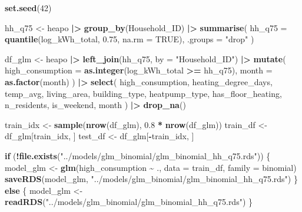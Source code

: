 \documentclass[
]{article}
\newenvironment{Shaded}{\begin{snugshade}}{\end{snugshade}}
\newcommand{\AttributeTok}[1]{\textcolor[rgb]{0.13,0.29,0.53}{#1}}
\newcommand{\ConstantTok}[1]{\textcolor[rgb]{0.56,0.35,0.01}{#1}}
\newcommand{\ControlFlowTok}[1]{\textcolor[rgb]{0.13,0.29,0.53}{\textbf{#1}}}
\newcommand{\DecValTok}[1]{\textcolor[rgb]{0.00,0.00,0.81}{#1}}
\newcommand{\FloatTok}[1]{\textcolor[rgb]{0.00,0.00,0.81}{#1}}
\newcommand{\FunctionTok}[1]{\textcolor[rgb]{0.13,0.29,0.53}{\textbf{#1}}}
\newcommand{\NormalTok}[1]{#1}
\newcommand{\OtherTok}[1]{\textcolor[rgb]{0.56,0.35,0.01}{#1}}
\newcommand{\SpecialCharTok}[1]{\textcolor[rgb]{0.81,0.36,0.00}{\textbf{#1}}}
\newcommand{\StringTok}[1]{\textcolor[rgb]{0.31,0.60,0.02}{#1}}
\begin{document}
\begin{Shaded}
\begin{Highlighting}[]
\FunctionTok{set.seed}\NormalTok{(}\DecValTok{42}\NormalTok{)}

\NormalTok{hh\_q75 }\OtherTok{\textless{}{-}}\NormalTok{ heapo }\SpecialCharTok{|\textgreater{}}
  \FunctionTok{group\_by}\NormalTok{(Household\_ID) }\SpecialCharTok{|\textgreater{}}
  \FunctionTok{summarise}\NormalTok{(}
    \AttributeTok{hh\_q75 =} \FunctionTok{quantile}\NormalTok{(log\_kWh\_total, }\FloatTok{0.75}\NormalTok{, }\AttributeTok{na.rm =} \ConstantTok{TRUE}\NormalTok{),}
    \AttributeTok{.groups =} \StringTok{"drop"}
\NormalTok{  )}

\NormalTok{df\_glm }\OtherTok{\textless{}{-}}\NormalTok{ heapo }\SpecialCharTok{|\textgreater{}}
  \FunctionTok{left\_join}\NormalTok{(hh\_q75, }\AttributeTok{by =} \StringTok{"Household\_ID"}\NormalTok{) }\SpecialCharTok{|\textgreater{}}
  \FunctionTok{mutate}\NormalTok{(}
    \AttributeTok{high\_consumption =} \FunctionTok{as.integer}\NormalTok{(log\_kWh\_total }\SpecialCharTok{\textgreater{}=}\NormalTok{ hh\_q75),}
    \AttributeTok{month =} \FunctionTok{as.factor}\NormalTok{(month)}
\NormalTok{  ) }\SpecialCharTok{|\textgreater{}}
  \FunctionTok{select}\NormalTok{(}
\NormalTok{    high\_consumption,}
\NormalTok{    heating\_degree\_days,}
\NormalTok{    temp\_avg,}
\NormalTok{    living\_area,}
\NormalTok{    building\_type,}
\NormalTok{    heatpump\_type,}
\NormalTok{    has\_floor\_heating,}
\NormalTok{    n\_residents,}
\NormalTok{    is\_weekend,}
\NormalTok{    month}
\NormalTok{  ) }\SpecialCharTok{|\textgreater{}}
  \FunctionTok{drop\_na}\NormalTok{()}

\NormalTok{train\_idx }\OtherTok{\textless{}{-}} \FunctionTok{sample}\NormalTok{(}\FunctionTok{nrow}\NormalTok{(df\_glm), }\FloatTok{0.8} \SpecialCharTok{*} \FunctionTok{nrow}\NormalTok{(df\_glm))}
\NormalTok{train\_df }\OtherTok{\textless{}{-}}\NormalTok{ df\_glm[train\_idx, ]}
\NormalTok{test\_df }\OtherTok{\textless{}{-}}\NormalTok{ df\_glm[}\SpecialCharTok{{-}}\NormalTok{train\_idx, ]}
\end{Highlighting}
\end{Shaded}

\begin{Shaded}
\begin{Highlighting}[]
\ControlFlowTok{if}\NormalTok{ (}\SpecialCharTok{!}\FunctionTok{file.exists}\NormalTok{(}\StringTok{"../models/glm\_binomial/glm\_binomial\_hh\_q75.rds"}\NormalTok{)) \{}
\NormalTok{  model\_glm }\OtherTok{\textless{}{-}} \FunctionTok{glm}\NormalTok{(high\_consumption }\SpecialCharTok{\textasciitilde{}}\NormalTok{ ., }\AttributeTok{data =}\NormalTok{ train\_df, }\AttributeTok{family =}\NormalTok{ binomial)}
  \FunctionTok{saveRDS}\NormalTok{(model\_glm, }\StringTok{"../models/glm\_binomial/glm\_binomial\_hh\_q75.rds"}\NormalTok{)}
\NormalTok{\} }\ControlFlowTok{else}\NormalTok{ \{}
\NormalTok{  model\_glm }\OtherTok{\textless{}{-}} \FunctionTok{readRDS}\NormalTok{(}\StringTok{"../models/glm\_binomial/glm\_binomial\_hh\_q75.rds"}\NormalTok{)}
\NormalTok{\}}
\end{Highlighting}
\end{Shaded}
\end{document}
